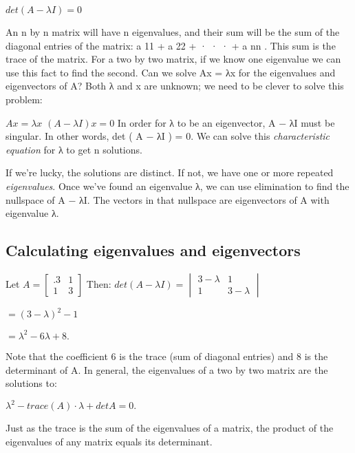 \documentclass{book}
\begin{document}
            $det ( A − \lambda I ) = 0$

An n by n matrix will have n eigenvalues, and their sum will be the sum of the diagonal entries of the matrix: a 11 + a 22 + · · · + a nn . This sum is the trace of the matrix. For a two by two matrix, if we know one eigenvalue we can use this fact to find the second.
Can we solve Ax = λx for the eigenvalues and eigenvectors of A? Both λ and x are unknown; we need to be clever to solve this problem:

 $Ax = \lambda x$
 $ ( A − \lambda I ) x = 0 $
In order for λ to be an eigenvector, A − λI must be singular. In other words, det ( A − λI ) = 0. We can solve this \emph{characteristic equation} for λ to get n solutions.

If we’re lucky, the solutions are distinct. If not, we have one or more repeated \emph{eigenvalues}.
Once we’ve found an eigenvalue λ, we can use elimination to find the nullspace of A − λI. The vectors in that nullspace are eigenvectors of A with eigenvalue λ.


\subsection*{Calculating eigenvalues and eigenvectors}
Let
$A =
\begin{bmatrix}. 
 3 & 1\\
 1 & 3
\end{bmatrix}$
Then:
$det ( A - \lambda I )=
\begin{vmatrix}
 3 − \lambda & 1\\
 1           & 3 - \lambda
\end{vmatrix}$

$= ( 3 - \lambda )^2 - 1$

$= \lambda^2 - 6λ + 8.$

Note that the coefficient 6 is the trace (sum of diagonal entries) and 8 is the determinant of A. In general, the eigenvalues of a two by two matrix are the solutions to:
                        
$ \lambda^2 - trace ( A ) · \lambda + det A = 0.$

Just as the trace is the sum of the eigenvalues of a matrix, the product of the eigenvalues of any matrix equals its determinant.
\end{document}

